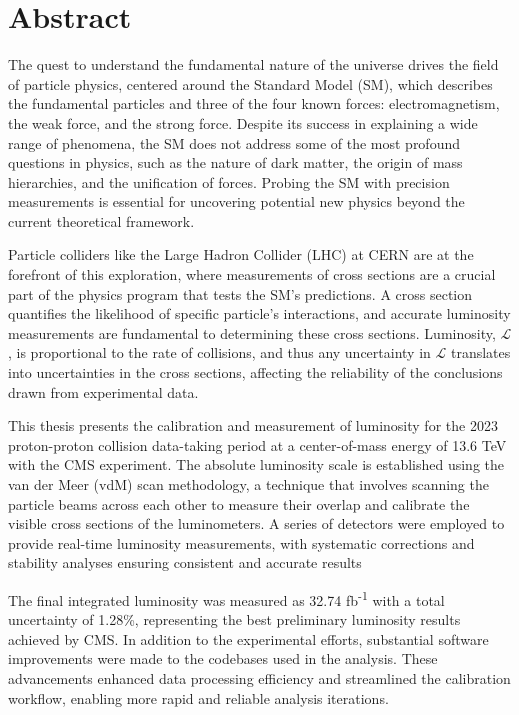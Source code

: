 \chapter*{Abstract}

The quest to understand the fundamental nature of the universe drives the field of particle physics, centered around the Standard Model (SM), which describes the fundamental particles and three of the four known forces: electromagnetism, the weak force, and the strong force. Despite its success in explaining a wide range of phenomena, the SM does not address some of the most profound questions in physics, such as the nature of dark matter, the origin of mass hierarchies, and the unification of forces. Probing the SM with precision measurements is essential for uncovering potential new physics beyond the current theoretical framework.

Particle colliders like the Large Hadron Collider (LHC) at CERN are at the forefront of this exploration, where measurements of cross sections are a crucial part of the physics program that tests the SM’s predictions. A cross section quantifies the likelihood of specific particle's interactions, and accurate luminosity measurements are fundamental to determining these cross sections. Luminosity, \(\mathcal{L}\), is proportional to the rate of collisions, and thus any uncertainty in \(\mathcal{L}\) translates into uncertainties in the cross sections, affecting the reliability of the conclusions drawn from experimental data.

This thesis presents the calibration and measurement of luminosity for the 2023 proton-proton collision data-taking period at a center-of-mass energy of 13.6 TeV with the CMS experiment. The absolute luminosity scale is established using the van der Meer (vdM) scan methodology, a technique that involves scanning the particle beams across each other to measure their overlap and calibrate the visible cross sections of the luminometers. A series of detectors were employed to provide real-time luminosity measurements, with systematic corrections and stability analyses ensuring consistent and accurate results

The final integrated luminosity was measured as 32.74 fb\textsuperscript{-1} with a total uncertainty of 1.28\%, representing the best preliminary luminosity results achieved by CMS. In addition to the experimental efforts, substantial software improvements were made to the codebases used in the analysis. These advancements enhanced data processing efficiency and streamlined the calibration workflow, enabling more rapid and reliable analysis iterations.

